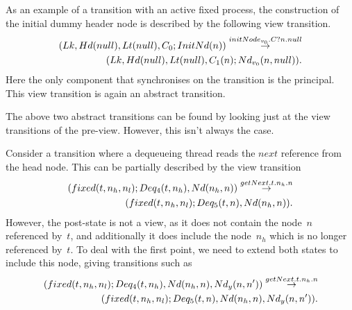 As an example of a transition with an active fixed process, the construction
of the initial dummy header node is described by the following view
transition.
\[
\begin{align}
(Lk, Hd(null), Lt(null), C_0; InitNd(n)) 
  \stackrel{initNode_{v_0}.C?n.null}\rightarrow \\
\qquad (Lk, Hd(null), Lt(null), C_1(n); Nd_{v_0}(n, null)).
\end{align}
\]
Here the only component that synchronises on the transition is the principal.
This view transition is again an abstract transition.

The above two abstract transitions can be found by looking just at the view
transitions of the pre-view.  However, this isn't always the case.

Consider a transition where a dequeueing thread reads the $next$ reference
from the head node.  This can be partially described by the view transition
\[
\begin{align}
(fixed(t, n_h, n_l); Deq_4(t, n_h), Nd(n_h, n))
  \stackrel{getNext.t.n_h.n}\rightarrow \\
\qquad (fixed(t, n_h, n_l); Deq_5(t, n), Nd(n_h, n)).
\end{align}
\]
However, the post-state is not a view, as it does not contain the node~$n$
referenced by~$t$, and additionally it does include the node~$n_h$ which is no
longer referenced by~$t$.  To deal with the first point, we need to extend
both states to include this node, giving transitions such as
\begin{equation}
\begin{align}
(fixed(t, n_h, n_l); Deq_4(t, n_h), Nd(n_h, n), Nd_y(n, n'))
  \stackrel{getNext.t.n_h.n}\rightarrow \\
\qquad (fixed(t, n_h, n_l);   Deq_5(t, n), Nd(n_h, n), Nd_y(n, n')).
\label{trans:getNext}
\end{align}
\end{equation}
%
